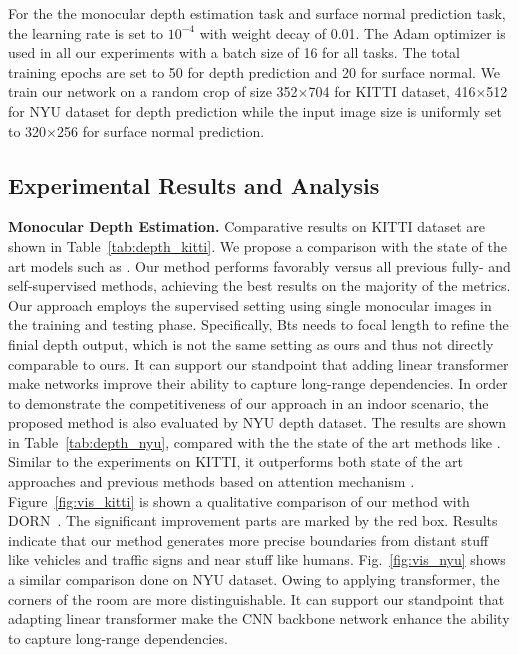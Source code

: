 For the the monocular depth estimation task and surface normal prediction task, the learning rate is set to $10^{-4}$ with weight decay of 0.01. The Adam optimizer is used in all our experiments with a batch size of 16 for all tasks. 
The total training epochs are set to 50 for depth prediction and 20 for surface normal.  We train our network on a random crop of size 352$\times$704 for KITTI dataset, 416$\times$512 for NYU dataset for depth prediction while
the input image size is uniformly set to 320$\times$256 for surface normal prediction.

\subsection{Experimental Results and Analysis}

\noindent \textbf{Monocular Depth Estimation.} 
Comparative results on KITTI dataset are shown in Table~\ref{tab:depth_kitti}. We propose a comparison with the state of the art models such as \cite{ranjan2019competitive,bian2019unsupervised,spencer2020defeat,cheng2020s,godard2019digging,tiwari2020pseudo,johnston2020self,klingner2020self,shu2020feature,guizilini20203d,fu2018deep,yin2019enforcing,gonzalez2020forget,lee2019big}. 
Our method performs favorably versus all previous fully- and self-supervised methods, achieving the best results on the majority of the metrics. 
Our approach employs the supervised setting using single monocular images in the training and testing phase.
Specifically, Bts needs to focal length to refine the finial depth output, which is not the same setting as ours and thus not directly comparable to ours. It can support our standpoint that adding linear transformer make networks improve their ability to capture long-range dependencies.
In order to demonstrate the competitiveness of our approach in an indoor scenario, the proposed method is also evaluated by NYU depth dataset. The results are shown in Table~\ref{tab:depth_nyu}, compared with the the state of the art methods like \cite{xu2018pad,li2017two,wang2020cliffnet,laina2016deeper,xu2017multi,lee2020multi,xia2020generating,fu2018deep,lee2019big,yin2019enforcing,huynh2020guiding}.
Similar to the experiments on KITTI, it outperforms both state of the art approaches and previous methods based on attention mechanism \cite{xu2017multi,xu2018pad,huynh2020guiding}. Figure~\ref{fig:vis_kitti} is shown a qualitative comparison of our method with DORN~\cite{fu2018deep}. The significant improvement parts are marked by the red box. 
Results indicate that our method generates more precise boundaries from distant stuff like vehicles and traffic signs and near stuff like humans.
Fig.~\ref{fig:vis_nyu} shows a similar comparison done on NYU dataset. Owing to applying transformer, the corners of the room are more distinguishable. It can support our standpoint that adapting linear transformer make the CNN backbone network enhance the ability to capture long-range dependencies. 

